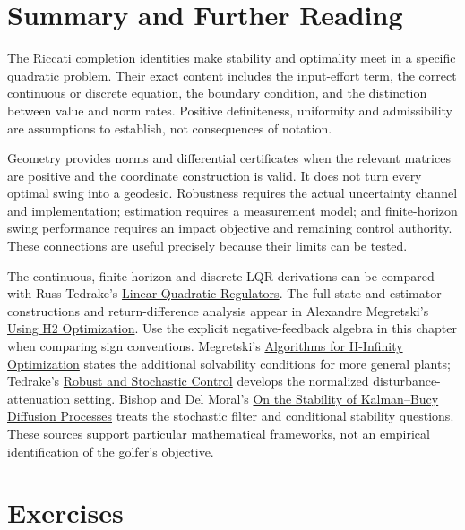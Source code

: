 \section{Summary and Further Reading}

The Riccati completion identities make stability and optimality meet in a specific quadratic problem. Their exact content includes the input-effort term, the correct continuous or discrete equation, the boundary condition, and the distinction between value and norm rates. Positive definiteness, uniformity and admissibility are assumptions to establish, not consequences of notation.

Geometry provides norms and differential certificates when the relevant matrices are positive and the coordinate construction is valid. It does not turn every optimal swing into a geodesic. Robustness requires the actual uncertainty channel and implementation; estimation requires a measurement model; and finite-horizon swing performance requires an impact objective and remaining control authority. These connections are useful precisely because their limits can be tested.

The continuous, finite-horizon and discrete LQR derivations can be compared with Russ Tedrake's \href{https://underactuated.mit.edu/lqr.html}{Linear Quadratic Regulators}. The full-state and estimator constructions and return-difference analysis appear in Alexandre Megretski's \href{https://ocw.mit.edu/courses/6-245-multivariable-control-systems-spring-2004/b49e52078cd6ec5648ce2d66dff869f2_lec4_6245_2004.pdf}{Using H2 Optimization}. Use the explicit negative-feedback algebra in this chapter when comparing sign conventions. Megretski's \href{https://ocw.mit.edu/courses/6-245-multivariable-control-systems-spring-2004/a9100bcb2c4fe5f05ef2d86007d1fd65_lec7_6245_2004.pdf}{Algorithms for H-Infinity Optimization} states the additional solvability conditions for more general plants; Tedrake's \href{https://underactuated.mit.edu/robust.html}{Robust and Stochastic Control} develops the normalized disturbance-attenuation setting. Bishop and Del Moral's \href{https://arxiv.org/abs/1610.04686}{On the Stability of Kalman--Bucy Diffusion Processes} treats the stochastic filter and conditional stability questions. These sources support particular mathematical frameworks, not an empirical identification of the golfer's objective.

\section{Exercises}

